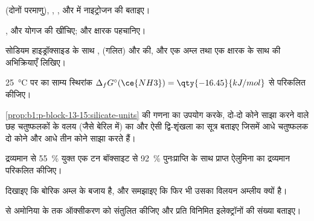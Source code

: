 \begin{exercise}[$\star$]\label{exo:b1:p-block-13-15:1}
 (दोनों परमाणु), , ,  और  में
नाइट्रोजन की  बताइए।
\end{exercise}

\begin{exercise}[$\star$]\label{exo:b1:p-block-13-15:2}
,  और योगज
 की  खींचिए;  और क्षारक पहचानिए।
\end{exercise}

\begin{exercise}[$\star$]\label{exo:b1:p-block-13-15:3}
सोडियम हाइड्रॉक्साइड के साथ ,  (गलित) और  की, और
एक अम्ल तथा एक क्षारक के साथ  की अभिक्रियाएँ लिखिए।
\end{exercise}

\begin{exercise}[$\star$]\label{exo:b1:p-block-13-15:4}
\qty{25}{\celsius} पर  का साम्य स्थिरांक
$\Delta_f G^\circ(\ce{NH3}) =
\qty{-16.45}{kJ/mol}$ से परिकलित कीजिए।
\end{exercise}

\begin{exercise}[$\star\star$]\label{exo:b1:p-block-13-15:5}
\cref{prop:b1:p-block-13-15:silicate-units} की गणना का उपयोग करके,
दो-दो कोने साझा करने वाले छह चतुष्फलकों के वलय (जैसे बेरिल में) का
और ऐसी द्वि-शृंखला का सूत्र बताइए जिसमें आधे चतुष्फलक दो कोने और
आधे तीन कोने साझा करते हैं।
\end{exercise}

\begin{exercise}[$\star\star$]\label{exo:b1:p-block-13-15:6}
द्रव्यमान से \qty{55}{\percent}  युक्त एक टन बॉक्साइट से
\qty{92}{\percent} पुनःप्राप्ति के साथ प्राप्त ऐलुमिना का द्रव्यमान
परिकलित कीजिए।
\end{exercise}

\begin{exercise}[$\star\star$]\label{exo:b1:p-block-13-15:7}
दिखाइए कि बोरिक अम्ल  के बजाय  है, और
समझाइए कि फिर भी उसका विलयन अम्लीय क्यों है।
\end{exercise}

\begin{exercise}[$\star\star$]\label{exo:b1:p-block-13-15:8}
 से अमोनिया के  तक ऑक्सीकरण को संतुलित कीजिए और
प्रति  विनिमित इलेक्ट्रॉनों की संख्या बताइए।
\end{exercise}

